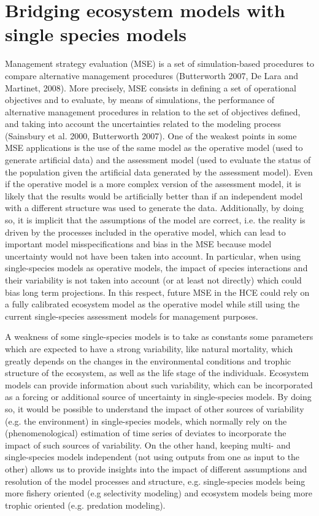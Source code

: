 \section*{Bridging ecosystem models with single species models}

Management strategy evaluation (MSE) is a set of simulation-based procedures to compare alternative management procedures (Butterworth 2007, De Lara and Martinet, 2008). More precisely, MSE consists in defining a set of operational objectives and to evaluate, by means of simulations, the performance of alternative management procedures in relation to the set of objectives defined, and taking into account the uncertainties related to the modeling process (Sainsbury et al. 2000, Butterworth 2007). One of the weakest points in some MSE applications is the use of the same model as the operative model (used to generate artificial data) and the assessment model (used to evaluate the status of the population given the artificial data generated by the assessment model). Even if the operative model is a more complex version of the assessment model, it is likely that the results would be artificially better than if an independent model with a different structure was used to generate the data. Additionally, by doing so, it is implicit that the assumptions of the model are correct, i.e. the reality is driven by the processes included in the operative model, which can lead to important model misspecifications and bias in the MSE because model uncertainty would not have been taken into account. In particular, when using single-species models as operative models, the impact of species interactions and their variability is not taken into account (or at least not directly) which could bias long term projections. In this respect, future MSE in the HCE could rely on a fully calibrated ecosystem model as the operative model while still using the current single-species assessment models for management purposes.  


A weakness of some single-species models is to take as constants some parameters which are expected to have a strong variability, like natural mortality, which greatly depends on the changes in the environmental conditions and trophic structure of the ecosystem, as well as the life stage of the individuals. Ecosystem models can provide information about such variability, which can be incorporated as a forcing or additional source of uncertainty in single-species models. By doing so, it would be possible to understand the impact of other sources of variability (e.g. the environment) in single-species models, which normally rely on the (phenomenological) estimation of time series of deviates to incorporate the impact of such sources of variability. On the other hand, keeping multi- and single-species models independent (not using outputs from one as input to the other) allows us to provide insights into the impact of different assumptions and resolution of the model processes and structure, e.g. single-species models being more fishery oriented (e.g selectivity modeling) and ecosystem models being more trophic oriented (e.g. predation modeling). 


